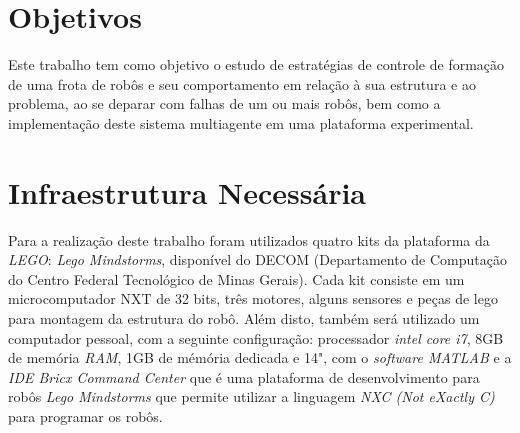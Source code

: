 \section{Objetivos}
\label{sec:objetivos}

Este trabalho tem como objetivo o estudo de estratégias de controle de formação de uma frota de robôs e seu comportamento em relação à sua estrutura e ao problema, ao se deparar com falhas de um ou mais robôs, bem como a implementação deste sistema multiagente em uma plataforma experimental.%

\section{Infraestrutura Necessária}
\label{sec:infra}


Para a realização deste trabalho foram utilizados quatro kits da plataforma da \emph{LEGO\textregistered}: \emph{Lego Mindstorms\textregistered}, disponível do DECOM (Departamento de Computação do Centro Federal Tecnológico de Minas Gerais). Cada kit consiste em um microcomputador NXT de 32 bits, três motores, alguns sensores e peças de lego para montagem da estrutura do robô. Além disto, também será utilizado  um computador pessoal, com a seguinte configuração: processador \emph{intel core i7}, 8GB de memória \emph{RAM}, 1GB de mémória dedicada e 14", com o \emph{software MATLAB\textregistered} e a \emph{IDE Bricx Command Center} \cite{sorceforge2001} que é uma plataforma de desenvolvimento para robôs \emph{Lego Mindstorms\textregistered} que permite utilizar a linguagem \emph{NXC (Not eXactly C)} para programar os robôs.